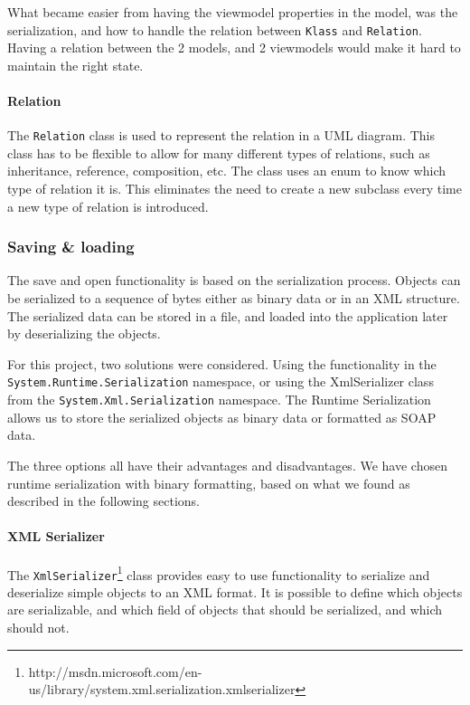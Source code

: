 What became easier from having the viewmodel properties in the model, was the
serialization, and how to handle the relation between \texttt{Klass} and
\texttt{Relation}. Having a relation between the 2 models, and 2 viewmodels
would make it hard to maintain the right state.

\paragraph{Relation}
The \texttt{Relation} class is used to represent the relation in a UML diagram.
This class has to be flexible to allow for many different types of relations,
such as inheritance, reference, composition, etc. The class uses an enum to know
which type of relation it is. This eliminates the need to create a new subclass
every time a new type of relation is introduced.

\subsubsection{Saving \& loading}
The save and open functionality is based on the serialization process. Objects
can be serialized to a sequence of bytes either as binary data or in an XML
structure. The serialized data can be stored in a file, and loaded into the
application later by deserializing the objects.

For this project, two solutions were considered. Using the functionality in the
\texttt{System.Runtime.Serialization} namespace, or using the XmlSerializer
class from the \texttt{System.Xml.Serialization} namespace. The Runtime
Serialization allows us to store the serialized objects as binary data or
formatted as SOAP data.

The three options all have their advantages and disadvantages. We have chosen
runtime serialization with binary formatting, based on what we found as
described in the following sections.

\paragraph{XML Serializer}

The 
\texttt{XmlSerializer}\footnote{http://msdn.microsoft.com/en-us/library/system.xml.serialization.xmlserializer}
 class provides easy to use
functionality to serialize and deserialize simple objects to an XML format. It
is possible to define which objects are serializable, and which field of objects
that should be serialized, and which should not.

